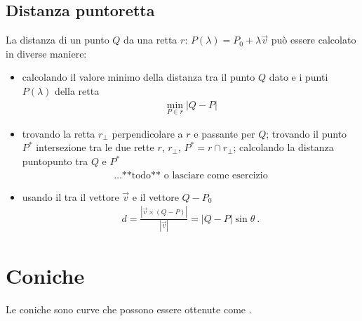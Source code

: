 \documentclass[letterpaper,10pt,english]{jupyterBook}
\begin{document}
\subsection{Distanza punto\sphinxhyphen{}retta}
\label{\detokenize{ch/analytic_geometry/analytic_geometry_2d/lines:distanza-punto-retta}}\label{\detokenize{ch/analytic_geometry/analytic_geometry_2d/lines:geometry-analytic-2d-lines-distance-point-line}}
\sphinxAtStartPar
La distanza di un punto \(Q\) da una retta \(r: \, P(\lambda) =  P_0 + \lambda \vec{v}\) può essere calcolato in diverse maniere:
\begin{itemize}
\item {} 
\sphinxAtStartPar
calcolando il valore minimo della distanza tra il punto \(Q\) dato e i punti \(P(\lambda)\) della retta
\begin{equation*}
\begin{split}\min_{P \in r} |Q - P|\end{split}
\end{equation*}
\item {} 
\sphinxAtStartPar
trovando la retta \(r_{\perp}\) perpendicolare a \(r\) e passante per \(Q\); trovando il punto \(P^*\) intersezione tra le due rette \(r\), \(r_{\perp}\), \(P^* = r \cap r_{\perp}\); calcolando la distanza punto\sphinxhyphen{}punto tra \(Q\) e \(P^*\)
\begin{equation*}
\begin{split} \dots \text{**todo** o lasciare come esercizio}\end{split}
\end{equation*}
\item {} 
\sphinxAtStartPar
usando il {\hyperref[\detokenize{ch/algebra/vector-algebra-euclidean-space:math-hs-algebra-vector-euclidean-space-inner-product}]{}} tra il vettore \(\vec{v}\) e il vettore \(Q-P_0\)
\begin{equation*}
\begin{split}d = \frac{|\vec{v} \times (Q-P)|}{|\vec{v}|} = |Q - P| \sin \theta \ .\end{split}
\end{equation*}
\end{itemize}

\sphinxstepscope


\section{Coniche}
\label{\detokenize{ch/analytic_geometry/analytic_geometry_2d/conics:coniche}}\label{\detokenize{ch/analytic_geometry/analytic_geometry_2d/conics:geometry-analytic-2d-conics}}\label{\detokenize{ch/analytic_geometry/analytic_geometry_2d/conics::doc}}
\sphinxAtStartPar
Le coniche sono curve che possono essere ottenute come {\hyperref[\detokenize{ch/analytic_geometry/analytic_geometry_3d/cone:geometry-analytic-3d-cone-conics}]{}}.
\end{document}

